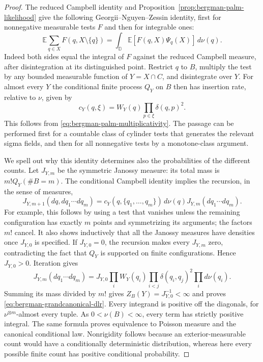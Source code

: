 \documentclass[11pt,a4paper]{article}
\numberwithin{equation}{section}
\theoremstyle{definition}
\theoremstyle{remark}
\newcommand{\D}{\mathbb D}
\newcommand{\E}{\mathbb E}
\begin{document}
\begin{proof}
The reduced Campbell identity and Proposition~\ref{prop:bergman-palm-likelihood}
give the following Georgii--Nguyen--Zessin identity, first for
nonnegative measurable tests $F$ and then for integrable ones:
\begin{equation}
 \E\sum_{q\in X}F(q,X\setminus\{q\})
 =\int_\D\E[F(q,X)\Psi_q(X)]\,d\nu(q).
 \label{eq:bergman-gnz}
\end{equation}
Indeed both sides equal the integral of $F$ against the reduced Campbell
measure, after disintegration at its distinguished point.
Restrict $q$ to $B$, multiply the test by any bounded measurable function
of $Y=X\cap C$, and disintegrate over $Y$.  For almost every $Y$ the
conditional finite process $Q_Y$ on $B$ then has insertion rate, relative
to $\nu$, given by
\[
 c_Y(q,\xi)=W_Y(q)\prod_{p\in\xi}\delta(q,p)^2.
\]
This follows from \eqref{eq:bergman-palm-multiplicativity}.  The passage
can be performed first for a countable class of cylinder tests that
generates the relevant sigma fields, and then for all nonnegative tests
by a monotone-class argument.

We spell out why this identity determines also the probabilities of
the different counts.  Let $J_{Y,m}$ be the symmetric Janossy measure:
its total mass is $m!Q_Y(\#B=m)$.  The conditional Campbell identity
implies the recursion, in the sense of measures,
\begin{equation}
 J_{Y,m+1}(dq,dq_1\cdots dq_m)
 =c_Y(q,\{q_1,\ldots,q_m\})\,d\nu(q)
   J_{Y,m}(dq_1\cdots dq_m).
 \label{eq:bergman-janossy-recursion}
\end{equation}
For example, this follows by using a test that vanishes unless the
remaining configuration has exactly $m$ points and symmetrizing its
arguments; the factors $m!$ cancel.  It also shows inductively that
all the Janossy measures have densities once $J_{Y,0}$ is specified.
If $J_{Y,0}=0$, the recursion makes every $J_{Y,m}$ zero, contradicting
the fact that $Q_Y$ is supported on finite configurations.  Hence
$J_{Y,0}>0$.  Iteration gives
\[
 J_{Y,m}(dq_1\cdots dq_m)
 =J_{Y,0}\prod_i W_Y(q_i)\prod_{i<j}\delta(q_i,q_j)^2
   \prod_i d\nu(q_i).
\]
Summing its mass divided by $m!$ gives
$Z_B(Y)=J_{Y,0}^{-1}<\infty$ and proves
\eqref{eq:bergman-grandcanonical-dlr}.  Every integrand is positive
off the diagonals, for $\nu^{\otimes m}$-almost every tuple.  As
$0<\nu(B)<\infty$, every term has strictly positive integral.
The same formula proves equivalence to Poisson measure and the
canonical conditional law.  Nonrigidity follows because an
exterior-measurable count would have a conditionally deterministic
distribution, whereas here every possible finite count has positive
conditional probability.
\end{proof}
\end{document}
